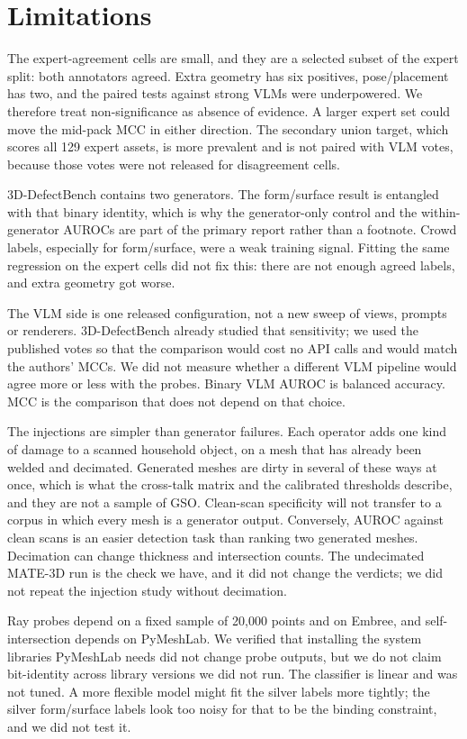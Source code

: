 \section{Limitations}
\label{sec:limit}

The expert-agreement cells are small, and they are a selected subset of the expert split: both annotators agreed.
Extra geometry has six positives, pose/placement has two, and the paired tests against strong VLMs were underpowered.
We therefore treat non-significance as absence of evidence.
A larger expert set could move the mid-pack MCC in either direction.
The secondary union target, which scores all 129 expert assets, is more prevalent and is not paired with VLM votes, because those votes were not released for disagreement cells.

3D-DefectBench contains two generators.
The form/surface result is entangled with that binary identity, which is why the generator-only control and the within-generator AUROCs are part of the primary report rather than a footnote.
Crowd labels, especially for form/surface, were a weak training signal.
Fitting the same regression on the expert cells did not fix this: there are not enough agreed labels, and extra geometry got worse.

The VLM side is one released configuration, not a new sweep of views, prompts or renderers.
3D-DefectBench already studied that sensitivity; we used the published votes so that the comparison would cost no API calls and would match the authors' MCCs.
We did not measure whether a different VLM pipeline would agree more or less with the probes.
Binary VLM AUROC is balanced accuracy.
MCC is the comparison that does not depend on that choice.

The injections are simpler than generator failures.
Each operator adds one kind of damage to a scanned household object, on a mesh that has already been welded and decimated.
Generated meshes are dirty in several of these ways at once, which is what the cross-talk matrix and the calibrated thresholds describe, and they are not a sample of GSO.
Clean-scan specificity will not transfer to a corpus in which every mesh is a generator output.
Conversely, AUROC against clean scans is an easier detection task than ranking two generated meshes.
Decimation can change thickness and intersection counts.
The undecimated MATE-3D run is the check we have, and it did not change the verdicts; we did not repeat the injection study without decimation.

Ray probes depend on a fixed sample of 20{,}000 points and on Embree, and self-intersection depends on PyMeshLab.
We verified that installing the system libraries PyMeshLab needs did not change probe outputs, but we do not claim bit-identity across library versions we did not run.
The classifier is linear and was not tuned.
A more flexible model might fit the silver labels more tightly; the silver form/surface labels look too noisy for that to be the binding constraint, and we did not test it.

